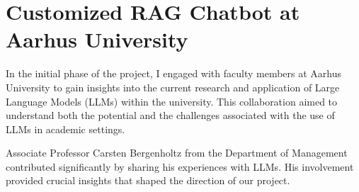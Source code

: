 





\section*{Customized RAG Chatbot at Aarhus University}

In the initial phase of the project, I engaged with faculty members at Aarhus University to gain insights into the current research and application of Large Language Models (LLMs) within the university. This collaboration aimed to understand both the potential and the challenges associated with the use of LLMs in academic settings.

Associate Professor Carsten Bergenholtz from the Department of Management contributed significantly by sharing his experiences with LLMs. His involvement provided crucial insights that shaped the direction of our project.

